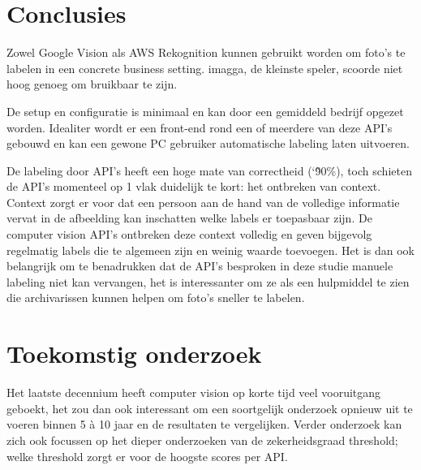 \documentclass[a0,portrait]{a0poster}
\begin{document}
\begin{multicols}{2}

\color{HoGentAccent1} 
\section*{Conclusies}
\color{black}
Zowel Google Vision als AWS Rekognition kunnen gebruikt worden om foto's te labelen in een concrete business setting. imagga, de kleinste speler, scoorde niet hoog genoeg om bruikbaar te zijn. 

De setup en configuratie is minimaal en kan door een gemiddeld bedrijf opgezet worden. Idealiter wordt er een front-end rond een of meerdere van deze API’s gebouwd en kan een gewone PC gebruiker automatische labeling laten uitvoeren.

De labeling door API's heeft een hoge mate van correctheid (\char`\~ 90\%), toch schieten de API's momenteel op 1 vlak duidelijk te kort: het ontbreken van context. Context zorgt er voor dat een persoon aan de hand van de volledige informatie vervat in de afbeelding kan inschatten welke labels er toepasbaar zijn. De computer vision API's ontbreken deze context volledig en geven bijgevolg regelmatig labels die te algemeen zijn en weinig waarde toevoegen. Het is dan ook belangrijk om te benadrukken dat de API's besproken in deze studie manuele labeling niet kan vervangen, het is interessanter om ze als een hulpmiddel te zien die archivarissen kunnen helpen om foto's sneller te labelen.
\color{HoGentAccent1} 
\section*{Toekomstig onderzoek}
\color{black}
Het laatste decennium heeft computer vision op korte tijd veel vooruitgang geboekt, het zou dan ook interessant om een soortgelijk onderzoek opnieuw uit te voeren binnen 5 à 10 jaar en de resultaten te vergelijken. Verder onderzoek kan zich ook focussen op het dieper onderzoeken van de zekerheidsgraad threshold; welke threshold zorgt er voor de hoogste scores per API.



\end{multicols}
\end{document}
